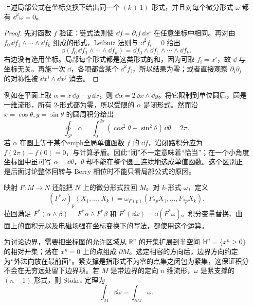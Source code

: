 \begin{proposition}[外微分与坐标无关]
上述局部公式在坐标变换下给出同一个 $(k+1)$-形式，并且对每个微分形式 $\omega$ 都有 $\dd^2\omega=0$。
\end{proposition}

\begin{proof}
先对函数 $f$ 验证：链式法则使 $\dd f=\partial_i f\,\dd x^i$ 在任意坐标中相同。再对由 $f_0\,\dd f_1\wedge\cdots\wedge\dd f_k$ 组成的形式，Leibniz 法则与 $\dd^2 f_i=0$ 给出
\[
\dd(f_0\,\dd f_1\wedge\cdots\wedge\dd f_k)
=\dd f_0\wedge\dd f_1\wedge\cdots\wedge\dd f_k.
\]
右边没有选用坐标。局部每个形式都是这类形式的和，因为可取 $f_i=x^i$，故 $\dd$ 与坐标无关。再施一次 $\dd$，各项都含某个 $\dd^2 f_i$，所以结果为零；或者直接观察 $\partial_i\partial_j$ 的对称性被 $\dd x^i\wedge\dd x^j$ 消去。
\end{proof}

例如在平面上取 $\alpha=x\,\dd y-y\,\dd x$，则 $\dd\alpha=2\,\dd x\wedge\dd y$。将它限制到单位圆后，圆是一维流形，所有 $2$-形式都为零，所以受限的 $\alpha$ 是闭形式。然而沿 $x=\cos\theta,y=\sin\theta$ 的圆周积分给出
\[
\oint_{S^1}\alpha=\int_0^{2\pi}(\cos^2\theta+\sin^2\theta)\,\dd\theta=2\pi.
\]
若 $\alpha$ 在圆上等于某个emph{全局单值}函数 $f$ 的 $\dd f$，沿闭路积分应为 $f(2\pi)-f(0)=0$，与计算矛盾。因此“闭”不一定意味着“恰当”；在一个小角度坐标图中虽可写 $\alpha=\dd\theta$，$\theta$ 却不能在整个圆上连续地选成单值函数。这个区别正是后面讨论整体回转与 Berry 相位时不能只看局部公式的原因。

映射 \(F:M\to N\) 还能把 \(N\) 上的微分形式拉回 \(M\)。对 \(k\)-形式 \(\omega\)，定义
\[
(F^*\omega)_p(X_1,\ldots,X_k)
=\omega_{F(p)}(F_{*p}X_1,\ldots,F_{*p}X_k).
\]
拉回满足 \(F^*(\alpha\wedge\beta)=F^*\alpha\wedge F^*\beta\) 和
\(F^*(\dd\omega)=\dd(F^*\omega)\)。积分变量替换、曲面上的面积元以及电磁场强在坐标变换下的写法，都使用这个运算。

为讨论边界，需要把坐标图的允许区域从 $\mathbb R^n$ 的开集扩展到半空间 $\mathbb H^n=\{x^n\ge0\}$ 的相对开集；落在 $x^n=0$ 上的点组成 $\partial M$。选定相容的方向后，边界方向约定为“外法向放在最前面”。紧支撑是指形式不为零的点集之闭包为紧集，这保证积分不会在无穷远处留下边界项。若 \(M\) 是带边界的定向 \(n\) 维流形，\(\omega\) 是紧支撑的 \((n-1)\)-形式，则 Stokes 定理为
\begin{equation}
\int_M\dd\omega=\int_{\partial M}\omega.
\label{eq:general-stokes-primer}
\end{equation}


